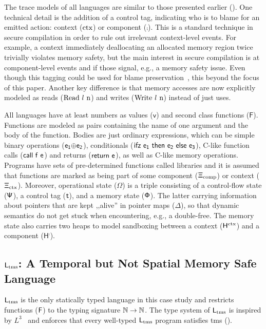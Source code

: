 \documentclass[dvipsnames,conference]{IEEEtran}
\theoremstyle{definition}
\begin{document}
{
  \renewcommand{\src}[1]{\mathsf{#1}}
The trace models of all languages are similar to those presented earlier ().
One technical detail is the addition of a control tag, indicating who is to blame for an emitted action: context ($\text{ctx}$) or component ($\comp$).
This is a standard technique in secure compilation in order to rule out irrelevant context-level events. 
For example, a context immediately deallocating an allocated memory region twice trivially violates memory safety, but the main interest in secure compilation is at component-level events and if those signal, e.g., a memory safety issue.
Even though this tagging could be used for blame preservation~\cite{patrignani2023blame}, this beyond the focus of this paper.
Another key difference is that memory accesses are now explicitly modeled as reads ($\src{\ev{Read\ \loc\ n}}$) and writes ($\src{\ev{Write\ \loc\ n}}$) instead of just uses.

All languages have at least numbers as values ($\src{v}$) and second class functions ($\src{F}$).
Functions are modeled as pairs containing the name of one argument and the body of the function.
Bodies are just ordinary expressions, which can be simple binary operations ($\src{\lbinop{\expr[_1]}{\expr[_2]}}$), conditionals ($\src{\lifz{\expr[_1]}{\expr[_2]}{\expr[_3]}}$), C-like function calls ($\src{\lcall{f}{e}}$) and returns ($\src{\lreturn{\expr}}$), as well as C-like memory operations. 
Programs have sets of pre-determined functions called libraries and it is assumed that functions are marked as being part of some component ($\src{\library_{\comp}}$) or context ($\src{\library_{\ctx}}$).
Moreover, operational state ($\src{\Omega}$) is a triple consisting of a control-flow state ($\src{\cfstate}$), a control tag ($\src{\sandboxtag}$), and a memory state ($\src{\memstate}$). 
The latter carrying information about pointers that are kept ,,alive'' in pointer maps ($\src{\Delta}$), so that dynamic semantics do not get stuck when encountering, e.g., a double-free.
The memory state also carries two heaps to model sandboxing between a context ($\src{H^{\ctx}}$) and a component ($\src{H^{\comp}}$).

}

\subsection{$\src{L_{\tmssafe}}$: A Temporal but Not Spatial Memory Safe Language}\label{subsec:ltms}

$\src{L_{\tmssafe}}$ is the only statically typed language in this case study and restricts functions ($\src{F}$) to the typing signature $\src{\natt\to\natt}$. 
The type system of $\src{L_{\tmssafe}}$ is inspired by $L^{3}$~\cite{morrisett2005L3,scherer2018fabulous} and enforces that every well-typed $\src{L_{\tmssafe}}$ program satisfies \gls*{tms} ().
\end{document}
